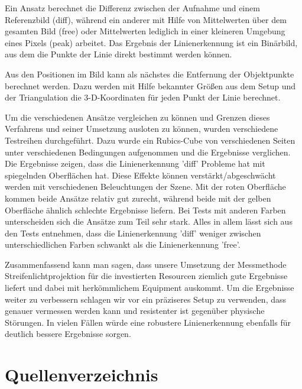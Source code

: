 \documentclass[ngerman,a4paper,parskip=half]{scrartcl}
\begin{document}
Ein Ansatz berechnet die Differenz zwischen der Aufnahme und einem Referenzbild (diff), während ein anderer mit Hilfe von Mittelwerten über dem gesamten Bild (free) oder Mittelwerten lediglich in einer kleineren Umgebung eines Pixels (peak) arbeitet.
Das Ergebnis der Linienerkennung ist ein Binärbild, aus dem die Punkte der Linie direkt bestimmt werden können.

Aus den Positionen im Bild kann als nächstes die Entfernung der Objektpunkte berechnet werden.
Dazu werden mit Hilfe bekannter Größen aus dem Setup und der Triangulation die 3-D-Koordinaten für jeden Punkt der Linie berechnet.

Um die verschiedenen Ansätze vergleichen zu können und Grenzen dieses Verfahrens und seiner Umsetzung ausloten zu können, wurden verschiedene Testreihen durchgeführt.
Dazu wurde ein Rubics-Cube von verschiedenen Seiten unter verschiedenen Bedingungen aufgenommen und die Ergebnisse verglichen.
Die Ergebnisse zeigen, dass die Linienerkennung 'diff' Probleme hat mit spiegelnden Oberflächen hat.
Diese Effekte können verstärkt/abgeschwächt werden mit verschiedenen Beleuchtungen der Szene.
Mit der roten Oberfläche kommen beide Ansätze relativ gut zurecht, während beide mit der gelben Oberfläche ähnlich schlechte Ergebnisse liefern.
Bei Tests mit anderen Farben unterscheiden sich die Ansätze zum Teil sehr stark.
Alles in allem lässt sich aus den Tests entnehmen, dass die Linienerkennung 'diff' weniger zwischen unterschiedlichen Farben schwankt als die Linienerkennung 'free'.

Zusammenfassend kann man sagen, dass unsere Umsetzung der Messmethode Streifenlichtprojektion für die investierten Resourcen ziemlich gute Ergebnisse liefert und dabei mit herkömmlichem Equipment auskommt.
Um die Ergebnisse weiter zu verbessern schlagen wir vor ein präziseres Setup zu verwenden, dass genauer vermessen werden kann und resistenter ist gegenüber physische Störungen. In vielen Fällen würde eine robustere Linienerkennung ebenfalls für deutlich bessere Ergebnisse sorgen.


\section{Quellenverzeichnis}

\end{document}
